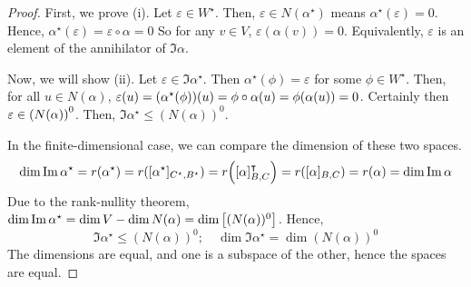 \begin{proof}
	First, we prove (i).
	Let \( \varepsilon \in W^\star \).
	Then, \( \varepsilon \in N(\alpha^\star) \) means \( \alpha^\star(\varepsilon) = 0 \).
	Hence, \( \alpha^\star(\varepsilon) = \varepsilon \circ \alpha = 0 \)
	So for any \( v \in V \), \( \varepsilon(\alpha(v)) = 0 \).
	Equivalently, \( \varepsilon \) is an element of the annihilator of \( \Im \alpha \).

	Now, we will show (ii).
	Let \( \varepsilon \in \Im \alpha^\star \).
	Then \( \alpha^\star(\phi) = \varepsilon \) for some \( \phi \in W^\star \).
	Then, for all \( u \in N(\alpha) \), \( \varepsilon(u) = \qty(\alpha^\star(\phi))(u) = \phi \circ \alpha(u) = \phi(\alpha(u)) = 0 \).
	Certainly then \( \varepsilon \in \qty(N(\alpha))^0 \).
	Then, \( \Im \alpha^\star \leq (N(\alpha))^0 \).

	In the finite-dimensional case, we can compare the dimension of these two spaces.
	\[
		\dim \Im \alpha^\star = r(\alpha^\star) = r\qty([\alpha^\star]_{C^\star, B^\star}) = r\qty([\alpha]_{B,C}^\intercal) = r\qty([\alpha]_{B,C}) = r(\alpha) = \dim \Im \alpha
	\]
	Due to the rank-nullity theorem, \( \dim \Im \alpha^\star = \dim V - \dim N(\alpha) = \dim\qty[(N(\alpha))^0] \).
	Hence,
	\[
		\Im \alpha^\star \leq (N(\alpha))^0;\quad \dim \Im \alpha^\star = \dim (N(\alpha))^0
	\]
	The dimensions are equal, and one is a subspace of the other, hence the spaces are equal.
\end{proof}

